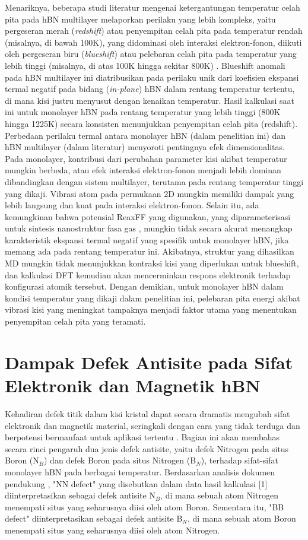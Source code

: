 Menariknya, beberapa studi literatur mengenai ketergantungan temperatur celah pita pada hBN multilayer melaporkan perilaku yang lebih kompleks, yaitu pergeseran merah (\textit{redshift}) atau penyempitan celah pita pada temperatur rendah (misalnya, di bawah 100K), yang didominasi oleh interaksi elektron-fonon, diikuti oleh pergeseran biru (\textit{blueshift}) atau pelebaran celah pita pada temperatur yang lebih tinggi (misalnya, di atas 100K hingga sekitar 800K) \cite{[1, 1], Du2017}. Blueshift anomali pada hBN multilayer ini diatribusikan pada perilaku unik dari koefisien ekspansi termal negatif pada bidang (\textit{in-plane}) hBN dalam rentang temperatur tertentu, di mana kisi justru menyusut dengan kenaikan temperatur. Hasil kalkulasi saat ini untuk monolayer hBN pada rentang temperatur yang lebih tinggi (800K hingga 1225K) secara konsisten menunjukkan penyempitan celah pita (redshift). Perbedaan perilaku termal antara monolayer hBN (dalam penelitian ini) dan hBN multilayer (dalam literatur) menyoroti pentingnya efek dimensionalitas. Pada monolayer, kontribusi dari perubahan parameter kisi akibat temperatur mungkin berbeda, atau efek interaksi elektron-fonon menjadi lebih dominan dibandingkan dengan sistem multilayer, terutama pada rentang temperatur tinggi yang dikaji. Vibrasi atom pada permukaan 2D mungkin memiliki dampak yang lebih langsung dan kuat pada interaksi elektron-fonon. Selain itu, ada kemungkinan bahwa potensial ReaxFF yang digunakan, yang diparameterisasi untuk sintesis nanostruktur fasa gas \cite{Ostadhossein2022}, mungkin tidak secara akurat menangkap karakteristik ekspansi termal negatif yang spesifik untuk monolayer hBN, jika memang ada pada rentang temperatur ini. Akibatnya, struktur yang dihasilkan MD mungkin tidak menunjukkan kontraksi kisi yang diperlukan untuk blueshift, dan kalkulasi DFT kemudian akan mencerminkan respons elektronik terhadap konfigurasi atomik tersebut. Dengan demikian, untuk monolayer hBN dalam kondisi temperatur yang dikaji dalam penelitian ini, pelebaran pita energi akibat vibrasi kisi yang meningkat tampaknya menjadi faktor utama yang menentukan penyempitan celah pita yang teramati.

\section{Dampak Defek Antisite pada Sifat Elektronik dan Magnetik hBN}
\label{sec:hbn_defek}
Kehadiran defek titik dalam kisi kristal dapat secara dramatis mengubah sifat elektronik dan magnetik material, seringkali dengan cara yang tidak terduga dan berpotensi bermanfaat untuk aplikasi tertentu \cite{[1, 1, 1]}. Bagian ini akan membahas secara rinci pengaruh dua jenis defek antisite, yaitu defek Nitrogen pada situs Boron (N$_B$) dan defek Boron pada situs Nitrogen (B$_N$), terhadap sifat-sifat monolayer hBN pada berbagai temperatur. Berdasarkan analisis dokumen pendukung \cite{[1, 1, 1]}, "NN defect" yang disebutkan dalam data hasil kalkulasi [1] diinterpretasikan sebagai defek antisite N$_B$, di mana sebuah atom Nitrogen menempati situs yang seharusnya diisi oleh atom Boron. Sementara itu, "BB defect" diinterpretasikan sebagai defek antisite B$_N$, di mana sebuah atom Boron menempati situs yang seharusnya diisi oleh atom Nitrogen.


